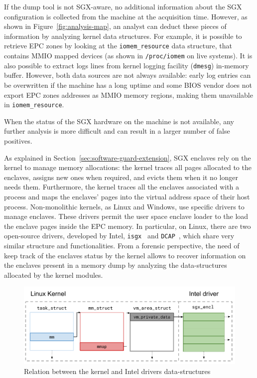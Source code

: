 If the dump tool is not SGX-aware, no additional information about the SGX
configuration is collected from the machine at the acquisition time.
However, as shown in Figure~\ref{fig:analysis-map}, an analyst can deduct
these pieces of information by analyzing kernel data structures. For
example, it is possible to retrieve EPC zones by looking at the
\texttt{iomem\_resource} data structure, that contains MMIO mapped devices
(as shown in \texttt{/proc/iomem} on live systems). It is also possible to
extract logs lines from kernel logging facility (\texttt{dmesg}) in-memory
buffer. However, both data sources are not always available: early log
entries can be overwritten if the machine has a long uptime and some BIOS
vendor does not export EPC zones addresses as MMIO memory regions, making
them unavailable in \texttt{iomem\_resource}. 

When the status of the SGX hardware on the machine is not available, any
further analysis is more difficult and can result in a larger number of
false positives.

As explained in Section~\ref{sec:software-guard-extension}, SGX enclaves rely 
on the kernel to manage memory allocations: the kernel traces all pages 
allocated to the enclaves, assigns new ones when required, and evicts them when 
it no longer needs them. Furthermore, the kernel traces all the enclaves 
associated with a process and maps the enclaves' pages into the virtual address 
space of their host process. Non-monolithic kernels, as Linux and Windows, use 
specific drivers to manage enclaves. These drivers permit the user space 
enclave loader to the load the enclave pages inside the EPC memory. In 
particular, on Linux, there are two open-source drivers, developed by Intel, 
\texttt{isgx}~\citep{sgxdriver} and \texttt{DCAP}~\citep{sgxdcap}, which share 
very similar structure and functionalities. From a forensic perspective, the 
need of keep track of the enclaves status by the kernel allows to recover 
information on the enclaves present in a memory dump by analyzing the 
data-structures allocated by the kernel modules.

\begin{figure}[t]
	\centering
	\includegraphics[width=0.8\linewidth]{fig_c8/sgx_driver}
	\caption{Relation between the kernel and Intel drivers data-structures}
	\label{fig:struct_sgx}
\end{figure}

